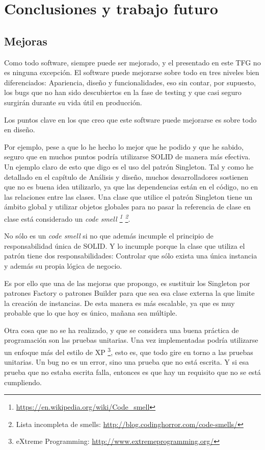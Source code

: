 \chapter{Conclusiones y trabajo futuro}

\section{Mejoras}
Como todo software, siempre puede ser mejorado, y el presentado en este
TFG no es ninguna excepci\'on. El software puede mejorarse sobre todo en tres niveles 
bien diferenciados: Apariencia, dise\~no y funcionalidades, eso sin contar, por
supuesto, los bugs que no han sido descubiertos en la fase de testing y que
casi seguro surgir\'an durante su vida \'util en producci\'on.

Los puntos clave en los que creo que este software puede mejorarse es sobre todo
en dise\~no.

Por ejemplo, pese a que lo he hecho lo mejor que he podido y que he sabido,
seguro que en muchos puntos podr\'ia utilizarse SOLID de manera m\'as efectiva. Un
ejemplo claro de esto que digo es el uso del patr\'on Singleton. Tal y como he detallado
en el cap\'itulo de An\'alisis y dise\~no, muchos desarrolladores sostienen
que no es buena idea utilizarlo, ya que las dependencias est\'an en el c\'odigo,
no en las relaciones entre las clases. Una clase que utilice el patr\'on Singleton tiene
un \'ambito global y utilizar objetos globales para
no pasar la referencia de clase en clase est\'a considerado un 
\emph{code smell \footnote{\url{https://en.wikipedia.org/wiki/Code_smell}}
	 \footnote{Lista incompleta de smells: \url{http://blog.codinghorror.com/code-smells/}}}.

No s\'olo es un \emph{code smell} si no que adem\'as incumple el principio de responsabilidad \'unica de SOLID.
Y lo incumple porque la clase que utiliza el patr\'on tiene dos responsabilidades: Controlar que s\'olo exista
una \'unica instancia y adem\'as su propia l\'ogica de negocio.

Es por ello que una de las mejoras que propongo, es sustituir los Singleton por patrones
Factory o patrones Builder para que sea esa clase externa la que limite la creaci\'on de instancias.
De esta manera es m\'as escalable, ya que es muy probable que lo que hoy es \'unico, ma\~nana sea m\'ultiple.

Otra cosa que no se ha realizado, y que se considera una buena pr\'actica de programaci\'on son
las pruebas unitarias. Una vez implementadas podr\'ia utilizarse un enfoque m\'as del estilo
de XP \footnote{eXtreme Programming: \url{http://www.extremeprogramming.org/}}, esto es, que todo gire
en torno a las pruebas unitarias. Un bug no es un error, sino una prueba que no est\'a escrita. Y si esa 
prueba que no estaba escrita falla, entonces es que hay un requisito que no se est\'a cumpliendo.

